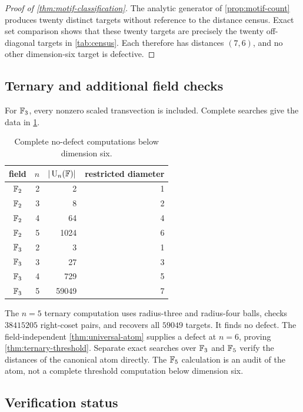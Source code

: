 \begin{proof}[Proof of \cref{thm:motif-classification}]
The analytic generator of \cref{prop:motif-count} produces twenty distinct targets without reference to the distance census.  Exact set comparison shows that these twenty targets are precisely the twenty off-diagonal targets in \cref{tab:census}.  Each therefore has distances $(7,6)$, and no other dimension-six target is defective.
\end{proof}

\subsection{Ternary and additional field checks}

For $\mathbb F_3$, every nonzero scaled transvection is included.  Complete searches give the data in \cref{tab:small-fields}.

\begin{table}[t]
\centering
\caption{Complete no-defect computations below dimension six.}
\label{tab:small-fields}
\begin{tabular}{@{}crrr@{}}
\toprule
field & $n$ & $|\operatorname{U}_n(\mathbb F)|$ & restricted diameter\\
\midrule
$\mathbb F_2$&2&2&1\\
$\mathbb F_2$&3&8&2\\
$\mathbb F_2$&4&64&4\\
$\mathbb F_2$&5&1024&6\\
\addlinespace
$\mathbb F_3$&2&3&1\\
$\mathbb F_3$&3&27&3\\
$\mathbb F_3$&4&729&5\\
$\mathbb F_3$&5&59049&7\\
\bottomrule
\end{tabular}
\end{table}

The $n=5$ ternary computation uses radius-three and radius-four balls, checks $38415205$ right-coset pairs, and recovers all $59049$ targets.  It finds no defect.  The field-independent \cref{thm:universal-atom} supplies a defect at $n=6$, proving \cref{thm:ternary-threshold}.  Separate exact searches over $\mathbb F_3$ and $\mathbb F_5$ verify the distances of the canonical atom directly.  The $\mathbb F_5$ calculation is an audit of the atom, not a complete threshold computation below dimension six.

\subsection{Verification status}

